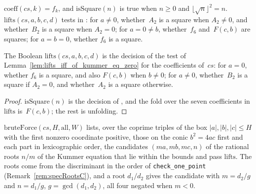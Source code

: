 \begin{definition}\label{def:BruteForce.lifts}
  \leanok
  $\mathrm{coeff}(cs, k) = f_k$, and $\mathrm{isSquare}(n)$ is true when $n \ge 0$ and
  $\lfloor \sqrt{n} \rfloor^2 = n$. $\mathrm{lifts}(cs, a, b, c, d)$ tests in : for
  $a \ne 0$, whether~$A_2$ is a square when $A_2 \ne 0$, and whether~$B_2$ is a square when
  $A_2 = 0$; for $a = 0 \ne b$, whether~$f_6$ and~$F(c, b)$ are squares; for $a = b = 0$, whether
  $f_6$ is a square.
\end{definition}

\begin{lemma}
  \label{lem:BruteForce.lifts_eq_ite}
  \leanok
  The Boolean $\mathrm{lifts}(cs, a, b, c, d)$ is the decision of the test of
  Lemma~\ref{lem:lifts_iff_of_kummer_eq_zero} for the coefficients of~$cs$: for $a = 0$, whether
  $f_6$ is a square, and also $F(c, b)$ when $b \ne 0$; for $a \ne 0$, whether~$B_2$ is a square
  if $A_2 = 0$, and whether~$A_2$ is a square otherwise.
\end{lemma}

\begin{proof}\leanok
  $\mathrm{isSquare}(n)$ is the decision of , and the fold over
  the seven coefficients in $\mathrm{lifts}$ is~$F(c, b)$; the rest is unfolding.
\end{proof}

\begin{definition}\label{def:bruteForce}
  \leanok
  $\mathrm{bruteForce}(cs, H, \mathrm{all}, W)$ lists, over the coprime triples of the box
  $|a|, |b|, |c| \le H$ with the first nonzero coordinate positive, those on the conic
  $b^2 = 4ac$ first and each part in lexicographic order, the candidates $(m a, m b, m c, n)$ of
  the rational roots $n/m$ of the Kummer equation that lie within the bounds and pass
  $\mathrm{lifts}$. The roots come from the discriminant in the order of \texttt{check\_one\_point}
  (Remark~\ref{rem:specRootsC}), and a root $d_1/d_2$ gives the candidate with $m = d_2/g$ and
  $n = d_1/g$, $g = \gcd(d_1, d_2)$, all four negated when $m < 0$.
\end{definition}


